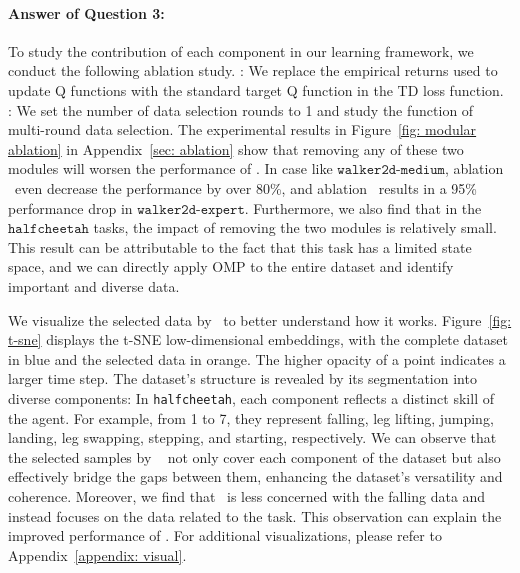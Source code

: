 

\paragraph{Answer of Question 3:}
To study the contribution of each component in our learning framework, we conduct the following ablation study. 
\nameq: We replace the empirical returns used to update Q functions with the standard target Q function in the TD loss function. 
\namei: We set the number of data selection rounds to 1 and study the function of multi-round data selection.
The experimental results in Figure~\ref{fig: modular ablation} in Appendix~\ref{sec: ablation} show that removing any of these two modules will worsen the performance of \name. In case like $\texttt{walker2d-medium}$, ablation \namei~even decrease the performance by over 80\%, and ablation \nameq~results in a 95\% performance drop in $\texttt{walker2d-expert}$. Furthermore, we also find that in the $\texttt{halfcheetah}$ tasks, the impact of removing the two modules is relatively small. This result can be attributable to the fact that this task has a limited state space, and we can directly apply OMP to the entire dataset and identify important and diverse data.

We visualize the selected data by \name~to better understand how it works. 
Figure~\ref{fig: t-sne} displays the t-SNE low-dimensional embeddings, with the complete dataset in blue and the selected data in orange. 
The higher opacity of a point indicates a larger time step. The dataset's structure is revealed by its segmentation into diverse components: 
In \texttt{halfcheetah}, each component reflects a distinct skill of the agent.
For example, from 1 to 7, they represent falling, leg lifting, jumping, landing, leg swapping, stepping, and starting, respectively.
We can observe that the selected samples by \name~ not only cover each component of the dataset but also effectively bridge the gaps between them, enhancing the dataset's versatility and coherence. 
Moreover, we find that \name~is less concerned with the falling data and instead focuses on the data related to the task.
This observation can explain the improved performance of \name. For additional visualizations, please refer to Appendix~\ref{appendix: visual}.


